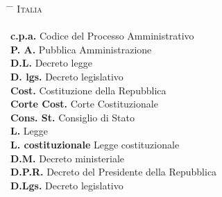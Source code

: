 \documentclass[12pt,it,a4paper,]{report}
\begin{document}
\begin{tabbing}
\hspace{12em} \= \hspace{60em} \= \kill
\textsc{Italia} \> \\
 \> \\
\textbf{c.p.a.} \> Codice del Processo Amministrativo \\
\textbf{P. A.} \> Pubblica Amministrazione \\
\textbf{D.L.} \> Decreto legge \\
\textbf{D. lgs.} \> Decreto legislativo \\
\textbf{Cost.} \> Costituzione della Repubblica \\
  \textbf{Corte Cost.} \> Corte Costituzionale \\
  \textbf{Cons. St.} \> Consiglio di Stato \\
\textbf{L.} \> Legge \\
\textbf{L. costituzionale} \> Legge costituzionale \\
\textbf{D.M.} \> Decreto ministeriale \\
\textbf{D.P.R.} \> Decreto del Presidente della Repubblica \\
\textbf{D.Lgs.} \> Decreto legislativo \\


\end{tabbing}
\end{document}

